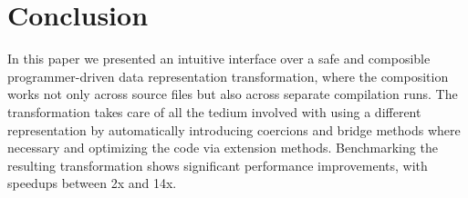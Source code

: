 \section{Conclusion}
\label{sec:concls}

In this paper we presented an intuitive interface over a safe and composible programmer-driven data representation transformation, where the composition works not only across source
files but also across separate compilation runs. The transformation takes care of all the tedium involved with using a different representation by automatically introducing coercions and bridge methods where necessary and optimizing the code via extension methods. Benchmarking the resulting transformation shows significant performance improvements, with speedups between 2x and 14x.